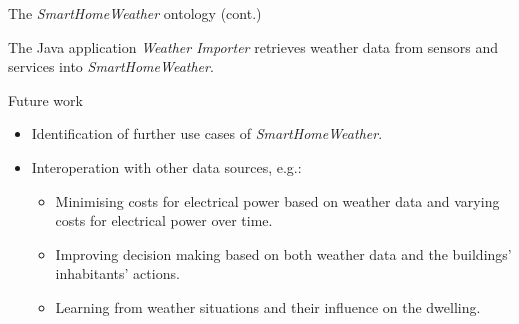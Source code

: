 \documentclass[final,hyperref={pdfpagelabels=true}]{beamer}
\begin{document}
\begin{frame}[fragile]
\begin{columns}[t]
\begin{column}{.45\textwidth}
\begin{block}{The \emph{SmartHomeWeather} ontology (cont.)}
	\vspace{10mm}
	\vspace{-12mm}
	
	The Java application \emph{Weather Importer} retrieves weather data from sensors and services into \emph{SmartHomeWeather}.
      \end{block}
      
      \begin{block}{Future work}
	\begin{itemize}
	  \item Identification of further use cases of \emph{SmartHomeWeather}.
	  \item Interoperation with other data sources, e.g.:
	    \begin{itemize}
	      \item Minimising costs for electrical power based on weather data and varying costs for electrical power over time.
	      \item Improving decision making based on both weather data and the buildings' inhabitants' actions.
	      \item Learning from weather situations and their influence on the dwelling.
	    \end{itemize}
	\end{itemize}
      \end{block}

%	
%	
    \end{column}
  \end{columns}


\end{frame}
\end{document}
